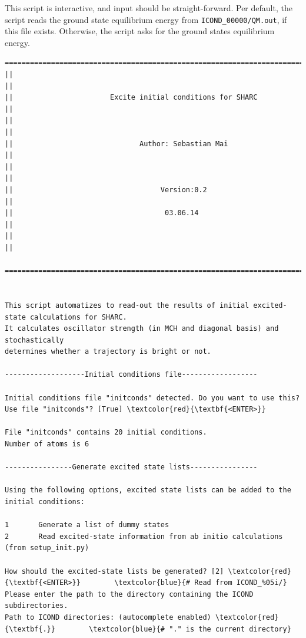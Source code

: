 \documentclass[a4paper,11pt,DIV=15,openany]{scrbook}
\newcommand{\ttt}[1]{\texttt{#1}}
\begin{document}
This script is interactive, and input should be straight-forward. Per default, the script reads the ground state equilibrium energy from \ttt{ICOND\_00000/QM.out}, if this file exists. Otherwise, the script asks for the ground states equilibrium energy.

\begin{oframed}
\footnotesize\begin{Verbatim}[commandchars=\\\{\}]
  ================================================================================
||                                                                                ||
||                       Excite initial conditions for SHARC                      ||
||                                                                                ||
||                              Author: Sebastian Mai                             ||
||                                                                                ||
||                                   Version:0.2                                  ||
||                                    03.06.14                                    ||
||                                                                                ||
  ================================================================================


This script automatizes to read-out the results of initial excited-state calculations for SHARC.
It calculates oscillator strength (in MCH and diagonal basis) and stochastically 
determines whether a trajectory is bright or not.
  
-------------------Initial conditions file------------------

Initial conditions file "initconds" detected. Do you want to use this?
Use file "initconds"? [True] \textcolor{red}{\textbf{<ENTER>}}

File "initconds" contains 20 initial conditions.
Number of atoms is 6

----------------Generate excited state lists----------------

Using the following options, excited state lists can be added to the initial conditions:

1       Generate a list of dummy states
2       Read excited-state information from ab initio calculations (from setup_init.py)

How should the excited-state lists be generated? [2] \textcolor{red}{\textbf{<ENTER>}}        \textcolor{blue}{# Read from ICOND_%05i/}
Please enter the path to the directory containing the ICOND subdirectories.
Path to ICOND directories: (autocomplete enabled) \textcolor{red}{\textbf{.}}        \textcolor{blue}{# "." is the current directory}


\end{Verbatim}
\end{oframed}
\end{document}
